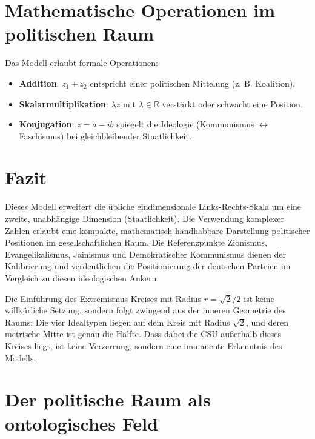 \documentclass[12pt, a4paper]{article}
\begin{document}
\section*{Mathematische Operationen im politischen Raum}

Das Modell erlaubt formale Operationen:

\begin{itemize}
    \item \textbf{Addition}: \(z_1 + z_2\) entspricht einer politischen Mittelung (z. B. Koalition).
    \item \textbf{Skalarmultiplikation}: \(\lambda z\) mit \(\lambda \in \mathbb{R}\) verstärkt oder schwächt eine Position.
    \item \textbf{Konjugation}: \(\overline{z} = a - ib\) spiegelt die Ideologie (Kommunismus \(\leftrightarrow\) Faschismus) bei gleichbleibender Staatlichkeit.
\end{itemize}

\section*{Fazit}

Dieses Modell erweitert die übliche eindimensionale Links-Rechts-Skala um eine zweite, unabhängige Dimension (Staatlichkeit). Die Verwendung komplexer Zahlen erlaubt eine kompakte, mathematisch handhabbare Darstellung politischer Positionen im gesellschaftlichen Raum. Die Referenzpunkte Zionismus, Evangelikalismus, Jainismus und Demokratischer Kommunismus dienen der Kalibrierung und verdeutlichen die Positionierung der deutschen Parteien im Vergleich zu diesen ideologischen Ankern.

Die Einführung des Extremismus-Kreises mit Radius \(r = \sqrt{2}/2\) ist keine willkürliche Setzung, sondern folgt zwingend aus der inneren Geometrie des Raums: Die vier Idealtypen liegen auf dem Kreis mit Radius \(\sqrt{2}\), und deren metrische Mitte ist genau die Hälfte. Dass dabei die CSU außerhalb dieses Kreises liegt, ist keine Verzerrung, sondern eine immanente Erkenntnis des Modells.


\newpage
\section{Der politische Raum als ontologisches Feld}
\end{document}
